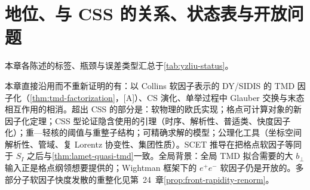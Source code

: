 \section{地位、与 CSS 的关系、状态表与开放问题}\label{sec:yzliu-status}

本章各陈述的标签、瓶颈与误差类型汇总于\cref{tab:yzliu-status}。

\begin{remark}\label{rem:yzliu-relation-css}
本章直接沿用而不重新证明的有：以 Collins 软因子表示的 DY/SIDIS 的 TMD 因子化（\cref{thm:tmd-factorization}，[A]）、CS 演化、单举过程中 Glauber 交换与末态相互作用的相消。超出 CSS 的部分是：软物理的欧氏实现；格点可计算对象的新因子化定理；CSS 型论证隐含使用的引理（时序、解析性、普适类、快度因子化）；重—轻核的阈值与重整子结构；可精确求解的模型；公理化工具（坐标空间解析性、管域、复 Lorentz 协变性、集团性质）。SCET 推导\cite{Vladimirov:2020ofp,Ebert:2022fmh,delRio:2023pse}在把格点软因子等同于 $S_I$ 之后与\cref{thm:lamet-quasi-tmd}一致。全局背景：全局 TMD 拟合\cite{Scimemi:2019cmh}需要的大 $b_\perp$ 输入正是格点纲领想要提供的；Wightman 框架下的 $e^+e^-$ 软因子\cite{Collins:2023cuo}仍是开放的。多部分子软因子快度发散的重整化见第~24~章\cref{prop:front-rapidity-renorm}。
\end{remark}

